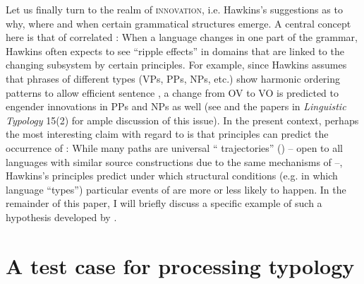 \documentclass[output=paper]{langsci/langscibook}
\begin{document}
Let us finally turn to the realm of \textsc{innovation}, i.e. Hawkins’s suggestions as to why, where and when certain grammatical structures emerge. A central concept here is that of correlated : When a language changes in one part of the grammar, Hawkins often expects to see “ripple effects” \citep[88]{Hawkins2014_VarEff} in domains that are linked to the changing subsystem by certain  principles. For example, since Hawkins assumes that phrases of different types (VPs, PPs, NPs, etc.) show harmonic ordering patterns to allow efficient sentence , a change from OV to VO is predicted to engender innovations in PPs and NPs as well (see \citealt{DunnEtAl2011} and the papers in \textit{Linguistic Typology} 15(2) for ample discussion of this issue). In the present context, perhaps the most interesting claim with regard to  is that  principles can predict the occurrence of : While many  paths are universal “ trajectories” (\citealt{BybeeBeckner2015}) – open to all languages with similar source constructions due to the same mechanisms of  –, Hawkins's  principles predict under which structural conditions (e.g. in which language “types”) particular events of  are more or less likely to happen. In the remainder of this paper, I will briefly discuss a specific example of such a hypothesis developed by \citet{Hawkins2014_VarEff}.

\section{A test case for processing typology} 
\end{document}
